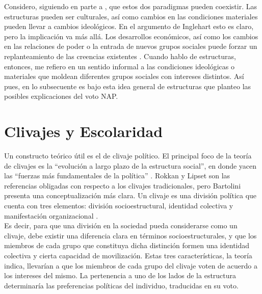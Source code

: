 Considero, siguiendo en parte a \textcite{Sewell92}, que estos dos paradigmas pueden coexistir. Las estructuras pueden ser culturales, así como cambios en las condiciones materiales pueden llevar a cambios ideológicos. En el argumento de Inglehart esto es claro, pero la implicación va más allá. Los desarrollos económicos, así como los cambios en las relaciones de poder o la entrada de nuevos grupos sociales puede forzar un replanteamiento de las creencias existentes \parencite{Berman01}. Cuando hablo de estructuras, entonces, me refiero en un sentido informal a las condiciones ideológicas o materiales que moldean diferentes grupos sociales con intereses distintos. Así pues, en lo subsecuente es bajo esta idea general de estructuras que planteo las posibles explicaciones del voto NAP.

\section{Clivajes y Escolaridad}

Un constructo teórico útil es el de clivaje político. El principal foco de la teoría de clivajes es la ``evolución a largo plazo de la estructura social'', en donde yacen las ``fuerzas más fundamentales de la política'' \parencite{Bornschier09}. Rokkan y Lipset son las referencias obligadas con respecto a los clivajes tradicionales, pero Bartolini presenta una conceptualización más clara. Un clivaje es una división política que cuenta con tres elementos: división socioestructural, identidad colectiva y manifestación organizacional \parencite{Bornschier09}.\\

Es decir, para que una división en la sociedad pueda considerarse como un clivaje, debe existir una diferencia clara en términos socioestructurales, y que los miembros de cada grupo que constituya dicha distinción formen una identidad colectiva y cierta capacidad de movilización. Estas tres características, la teoría indica, llevarían a que los miembros de cada grupo del clivaje voten de acuerdo a los intereses del mismo. La pertenencia a uno de los lados de la estructura determinaría las preferencias políticas del individuo, traducidas en su voto.\\

